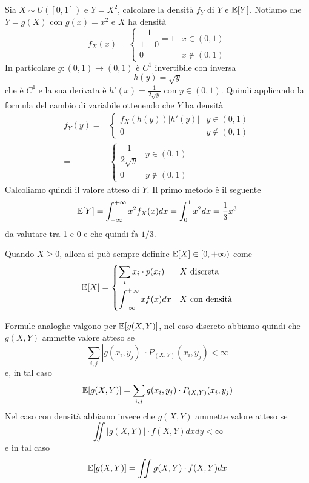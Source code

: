 \begin{example}
	Sia $X \sim U([0,1])$ e $Y = X^2$, calcolare la densità $f_Y$ di $Y$ e $\mathbb{E}[Y]$. Notiamo che
	$Y = g(X)$ con $g(x) = x^2$ e $X$ ha densità
	\[
		f_X(x) = \begin{cases}
			\dfrac{1}{1-0} = 1 & x \in (0,1)    \\
			0                  & x \notin (0,1)
		\end{cases}
	\]
	In particolare $g : (0,1) \to (0,1)$ è $C^1$ invertibile con inversa
	\[ h(y) = \sqrt{y} \]
	che è $C^1$ e la sua derivata è $h'(x) = \frac{1}{2 \sqrt{y}}$ con $y \in (0,1)$. Quindi
	applicando la formula del cambio di variabile ottenendo che $Y$ ha densità
	\begin{align*}
		f_Y (y) = & \begin{cases}
			            f_X (h(y)) |h'(y)| & y \in (0,1)    \\
			            0                  & y \notin (0,1)
		            \end{cases}                  \\
		=         & \begin{cases}
			            \dfrac{1}{2 \sqrt{y}} & y \in (0,1)    \\
			            0                     & y \notin (0,1)
		            \end{cases}
	\end{align*}
	Calcoliamo quindi il valore atteso di $Y$. Il primo metodo è il seguente
	\[ \mathbb{E}[Y] = \int_{-\infty}^{+\infty} x^2 f_X (x) dx = \int_0^1 x^2 dx = \frac{1}{3} x^3 \]
	da valutare tra 1 e 0 e che quindi fa $1/3$.
\end{example}

\begin{observation}
	Quando $X \geq 0$, allora si può sempre definire $\mathbb{E}[X] \in [0, +\infty)$ come
	\[
		\mathbb{E}[X] = \begin{cases}
			\displaystyle\sum_i x_i \cdot p(x_i)            & X \text{ discreta}    \\[3ex]
			\displaystyle\int_{-\infty}^{+\infty} x f(x) dx & X \text{ con densità}
		\end{cases}
	\]
\end{observation}

\begin{observation}
	Formule analoghe valgono per $\mathbb{E}[g(X,Y)]$, nel caso discreto abbiamo quindi che $g(X, Y)$
	ammette valore atteso se
	\[ \sum_{i,j} |g(x_i, y_j)| \cdot P_{(X,Y)} (x_i, y_j) < \infty \]
	e, in tal caso
	\[ \mathbb{E}[g(X,Y)] = \sum_{i,j} g(x_i, y_j) \cdot P_{(X,Y)} (x_i, y_j) \]
	Nel caso con densità abbiamo invece che $g(X,Y)$ ammette valore atteso se
	\[ \iint |g(X,Y)| \cdot f (X,Y) dx dy < \infty \]
	e in tal caso
	\[ \mathbb{E}[g(X, Y)] = \iint g(X, Y) \cdot f(X,Y) dx \]
\end{observation}

